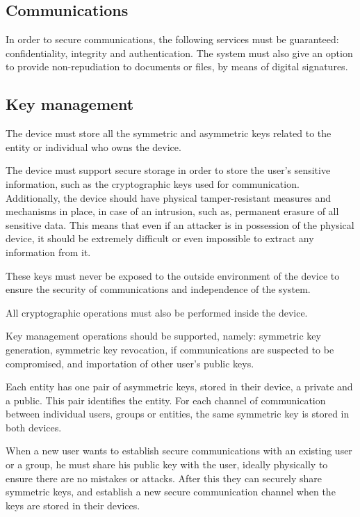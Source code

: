 \subsection{Communications} \label{chap:problem:services:comms}
In order to secure communications, the following services must be guaranteed: confidentiality, integrity and authentication.
The system must also give an option to provide non-repudiation to documents or files, by means of digital signatures.


\subsection{Key management} \label{chap:problem:services:key}
The device must store all the symmetric and asymmetric keys related to the entity or individual who owns the device.

The device must support secure storage in order to store the user's sensitive information, such as the cryptographic keys used for communication.
Additionally, the device should have physical tamper-resistant measures and mechanisms in place, in case of an intrusion, such as, permanent erasure of all sensitive data. 
This means that even if an attacker is in possession of the physical device, it should be extremely difficult or even impossible to extract any information from it.

These keys must never be exposed to the outside environment of the device to ensure the security of communications and independence of the system.

All cryptographic operations must also be performed inside the device.

Key management operations should be supported, namely: symmetric key generation, symmetric key revocation, if communications are suspected to be compromised, and importation of other user's public keys.

Each entity has one pair of asymmetric keys, stored in their device, a private and a public. This pair identifies the entity.
For each channel of communication between individual users, groups or entities, the same symmetric key is stored in both devices.

When a new user wants to establish secure communications with an existing user or a group, he must share his public key with the user, ideally physically to ensure there are no mistakes or attacks. After this they can securely share symmetric keys, and establish a new secure communication channel when the keys are stored in their devices.

